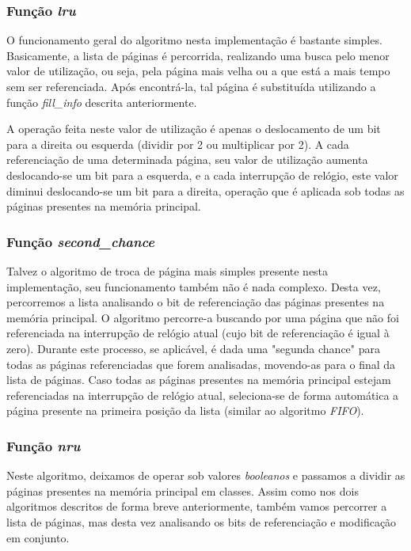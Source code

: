 \documentclass[a4paper, 12pt]{article}
\begin{document}
\subsubsection{Função \emph{lru}}

O funcionamento geral do algoritmo nesta implementação é bastante simples. Basicamente, a lista de páginas é percorrida, realizando uma busca pelo menor valor de utilização, ou seja, pela página mais velha ou a que está a mais tempo sem ser referenciada. Após encontrá-la, tal página é substituída utilizando a função \emph{fill\_info} descrita anteriormente.

A operação feita neste valor de utilização é apenas o deslocamento de um bit para a direita ou esquerda (dividir por 2 ou multiplicar por 2). A cada referenciação de uma determinada página, seu valor de utilização aumenta deslocando-se um bit para a esquerda, e a cada interrupção de relógio, este valor diminui deslocando-se um bit para a direita, operação que é aplicada sob todas as páginas presentes na memória principal.

\subsubsection{Função \emph{second\_chance}}

Talvez o algoritmo de troca de página mais simples presente nesta implementação, seu funcionamento também não é nada complexo. Desta vez, percorremos a lista analisando o bit de referenciação das páginas presentes na memória principal. O algoritmo percorre-a buscando por uma página que não foi referenciada na interrupção de relógio atual (cujo bit de referenciação é igual à zero). Durante este processo, se aplicável, é dada uma "segunda chance" para todas as páginas referenciadas que forem analisadas, movendo-as para o final da lista de páginas. Caso todas as páginas presentes na memória principal estejam referenciadas na interrupção de relógio atual, seleciona-se de forma automática a página presente na primeira posição da lista (similar ao algoritmo \emph{FIFO}).

\subsubsection{Função \emph{nru}}

Neste algoritmo, deixamos de operar sob valores \emph{booleanos} e passamos a dividir as páginas presentes na memória principal em classes. Assim como nos dois algoritmos descritos de forma breve anteriormente, também vamos percorrer a lista de páginas, mas desta vez analisando os bits de referenciação e modificação em conjunto. 
\end{document}
